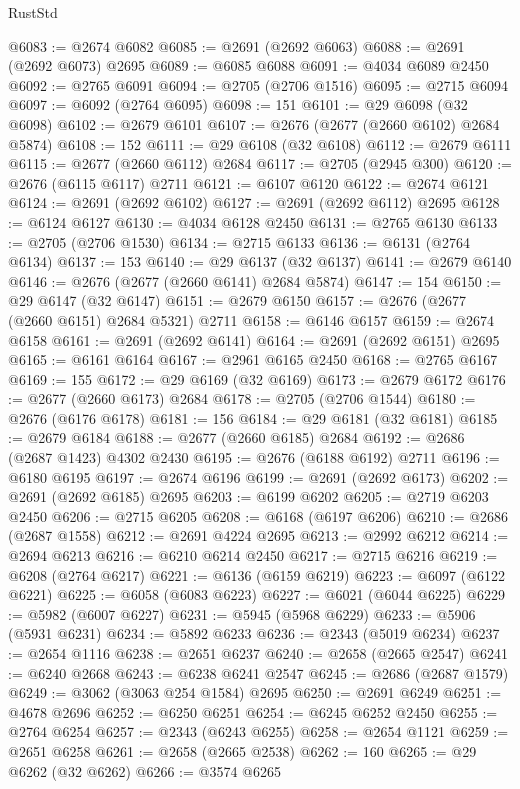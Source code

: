 \begin{lexlean}{RustStd}
\begin{coremodule}
@6083 := @2674 @6082
@6085 := @2691 (@2692 @6063)
@6088 := @2691 (@2692 @6073) @2695
@6089 := @6085 @6088
@6091 := @4034 @6089 @2450
@6092 := @2765 @6091
@6094 := @2705 (@2706 @1516)
@6095 := @2715 @6094
@6097 := @6092 (@2764 @6095)
@6098 := 151
@6101 := @29 @6098 (@32 @6098)
@6102 := @2679 @6101
@6107 := @2676 (@2677 (@2660 @6102) @2684 @5874)
@6108 := 152
@6111 := @29 @6108 (@32 @6108)
@6112 := @2679 @6111
@6115 := @2677 (@2660 @6112) @2684
@6117 := @2705 (@2945 @300)
@6120 := @2676 (@6115 @6117) @2711
@6121 := @6107 @6120
@6122 := @2674 @6121
@6124 := @2691 (@2692 @6102)
@6127 := @2691 (@2692 @6112) @2695
@6128 := @6124 @6127
@6130 := @4034 @6128 @2450
@6131 := @2765 @6130
@6133 := @2705 (@2706 @1530)
@6134 := @2715 @6133
@6136 := @6131 (@2764 @6134)
@6137 := 153
@6140 := @29 @6137 (@32 @6137)
@6141 := @2679 @6140
@6146 := @2676 (@2677 (@2660 @6141) @2684 @5874)
@6147 := 154
@6150 := @29 @6147 (@32 @6147)
@6151 := @2679 @6150
@6157 := @2676 (@2677 (@2660 @6151) @2684 @5321) @2711
@6158 := @6146 @6157
@6159 := @2674 @6158
@6161 := @2691 (@2692 @6141)
@6164 := @2691 (@2692 @6151) @2695
@6165 := @6161 @6164
@6167 := @2961 @6165 @2450
@6168 := @2765 @6167
@6169 := 155
@6172 := @29 @6169 (@32 @6169)
@6173 := @2679 @6172
@6176 := @2677 (@2660 @6173) @2684
@6178 := @2705 (@2706 @1544)
@6180 := @2676 (@6176 @6178)
@6181 := 156
@6184 := @29 @6181 (@32 @6181)
@6185 := @2679 @6184
@6188 := @2677 (@2660 @6185) @2684
@6192 := @2686 (@2687 @1423) @4302 @2430
@6195 := @2676 (@6188 @6192) @2711
@6196 := @6180 @6195
@6197 := @2674 @6196
@6199 := @2691 (@2692 @6173)
@6202 := @2691 (@2692 @6185) @2695
@6203 := @6199 @6202
@6205 := @2719 @6203 @2450
@6206 := @2715 @6205
@6208 := @6168 (@6197 @6206)
@6210 := @2686 (@2687 @1558)
@6212 := @2691 @4224 @2695
@6213 := @2992 @6212
@6214 := @2694 @6213
@6216 := @6210 @6214 @2450
@6217 := @2715 @6216
@6219 := @6208 (@2764 @6217)
@6221 := @6136 (@6159 @6219)
@6223 := @6097 (@6122 @6221)
@6225 := @6058 (@6083 @6223)
@6227 := @6021 (@6044 @6225)
@6229 := @5982 (@6007 @6227)
@6231 := @5945 (@5968 @6229)
@6233 := @5906 (@5931 @6231)
@6234 := @5892 @6233
@6236 := @2343 (@5019 @6234)
@6237 := @2654 @1116
@6238 := @2651 @6237
@6240 := @2658 (@2665 @2547)
@6241 := @6240 @2668
@6243 := @6238 @6241 @2547
@6245 := @2686 (@2687 @1579)
@6249 := @3062 (@3063 @254 @1584) @2695
@6250 := @2691 @6249
@6251 := @4678 @2696
@6252 := @6250 @6251
@6254 := @6245 @6252 @2450
@6255 := @2764 @6254
@6257 := @2343 (@6243 @6255)
@6258 := @2654 @1121
@6259 := @2651 @6258
@6261 := @2658 (@2665 @2538)
@6262 := 160
@6265 := @29 @6262 (@32 @6262)
@6266 := @3574 @6265

\end{coremodule}
\end{lexlean}
